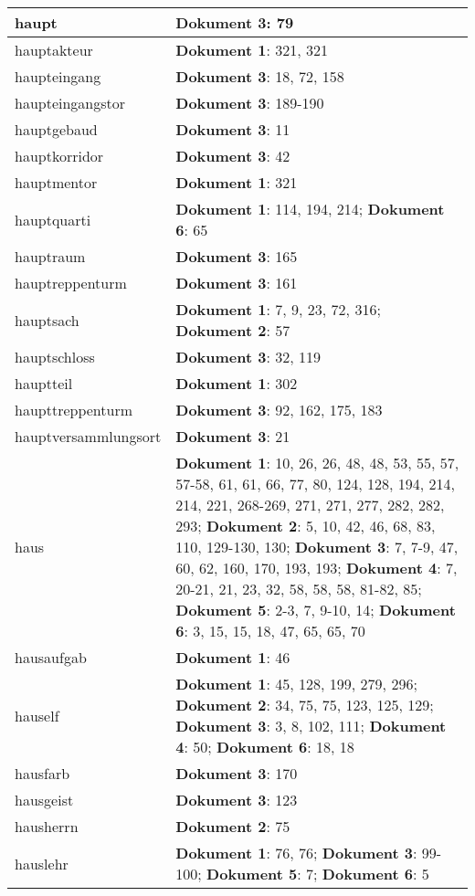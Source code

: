 \documentclass[a5paper]{article}
\begin{document}
\begin{longtable}[l]{|l|p{3in}|}
\hline
haupt & \textbf{Dokument 3}: 79 \\
\hline
hauptakteur & \textbf{Dokument 1}: 321, 321 \\
\hline
haupteingang & \textbf{Dokument 3}: 18, 72, 158 \\
\hline
haupteingangstor & \textbf{Dokument 3}: 189-190 \\
\hline
hauptgebaud & \textbf{Dokument 3}: 11 \\
\hline
hauptkorridor & \textbf{Dokument 3}: 42 \\
\hline
hauptmentor & \textbf{Dokument 1}: 321 \\
\hline
hauptquarti & \textbf{Dokument 1}: 114, 194, 214; \textbf{Dokument 6}: 65 \\
\hline
hauptraum & \textbf{Dokument 3}: 165 \\
\hline
hauptreppenturm & \textbf{Dokument 3}: 161 \\
\hline
hauptsach & \textbf{Dokument 1}: 7, 9, 23, 72, 316; \textbf{Dokument 2}: 57 \\
\hline
hauptschloss & \textbf{Dokument 3}: 32, 119 \\
\hline
hauptteil & \textbf{Dokument 1}: 302 \\
\hline
haupttreppenturm & \textbf{Dokument 3}: 92, 162, 175, 183 \\
\hline
hauptversammlungsort & \textbf{Dokument 3}: 21 \\
\hline
haus & \textbf{Dokument 1}: 10, 26, 26, 48, 48, 53, 55, 57, 57-58, 61, 61, 66, 77, 80, 124, 128, 194, 214, 214, 221, 268-269, 271, 271, 277, 282, 282, 293; \textbf{Dokument 2}: 5, 10, 42, 46, 68, 83, 110, 129-130, 130; \textbf{Dokument 3}: 7, 7-9, 47, 60, 62, 160, 170, 193, 193; \textbf{Dokument 4}: 7, 20-21, 21, 23, 32, 58, 58, 58, 81-82, 85; \textbf{Dokument 5}: 2-3, 7, 9-10, 14; \textbf{Dokument 6}: 3, 15, 15, 18, 47, 65, 65, 70 \\
\hline
hausaufgab & \textbf{Dokument 1}: 46 \\
\hline
hauself & \textbf{Dokument 1}: 45, 128, 199, 279, 296; \textbf{Dokument 2}: 34, 75, 75, 123, 125, 129; \textbf{Dokument 3}: 3, 8, 102, 111; \textbf{Dokument 4}: 50; \textbf{Dokument 6}: 18, 18 \\
\hline
hausfarb & \textbf{Dokument 3}: 170 \\
\hline
hausgeist & \textbf{Dokument 3}: 123 \\
\hline
hausherrn & \textbf{Dokument 2}: 75 \\
\hline
hauslehr & \textbf{Dokument 1}: 76, 76; \textbf{Dokument 3}: 99-100; \textbf{Dokument 5}: 7; \textbf{Dokument 6}: 5 \\

\end{longtable}
\end{document}
